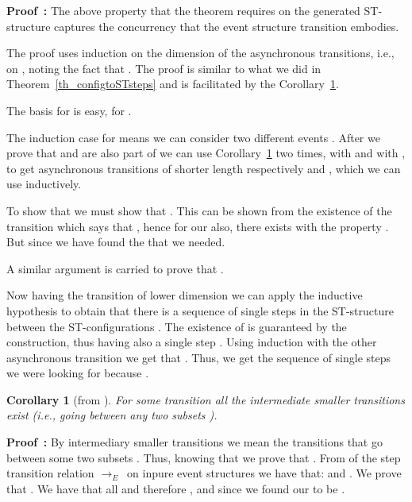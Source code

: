 \documentclass[submission,copyright,creativecommons]{eptcs}
\newtheorem{corollary}[theorem]{Corollary}
\newenvironment{proof}[1][\!\!\,]{\vspace{1ex}\noindent\textbf{Proof #1: }}{\hfill\vspace{2ex}}
\newcounter{case}
\newcommand\stepTransEvGlabbeek{\ensuremath{\rightarrow_{E}}}
\begin{document}
\begin{proof}
The above property that the theorem requires on the generated ST-structure captures the concurrency that the event structure transition embodies.


The proof uses induction on the dimension of the asynchronous transitions, i.e., on , noting the fact that .
The proof is similar to what we did in Theorem~\ref{th_configtoSTsteps} and is facilitated by the Corollary~\ref{cor_ev_intermediaryTrans}.

The basis for  is easy, for .

The induction case for  means we can consider two different events . After we prove that  and  are also part of  we can use Corollary~\ref{cor_ev_intermediaryTrans} two times, with  and with , to get asynchronous transitions of shorter length respectively  and , which we can use inductively.

To show that  we must show that . 
This can be shown from the existence of the transition  which says that , hence for our  also, there exists  with the property . But since  we have found the  that we needed.

A similar argument is carried to prove that .

Now having the transition  of lower dimension we can apply the inductive hypothesis to obtain that there is a sequence of single steps in the ST-structure  between the ST-configurations . The existence of  is guaranteed by the construction, thus having also a single step . Using induction with the other asynchronous transition we get that . Thus, we get the sequence of single steps we were looking for because .
\end{proof}


\begin{corollary}[from {\cite[Def.2.3]{GlabbeekP09configStruct}}]\label{cor_ev_intermediaryTrans}
For some transition  all the intermediate smaller transitions exist (i.e., going between any two subsets ).
\end{corollary}

\begin{proof}
By intermediary smaller transitions we mean the transitions that go between some two subsets . Thus, knowing that  we prove that . From \cite[Def.2.3]{GlabbeekP09configStruct} of the step transition relation \stepTransEvGlabbeek\ on inpure event structures we have that:  and . We prove that . We have that all  and therefore , and since  we found our  to be .
\end{proof}
\end{document}
